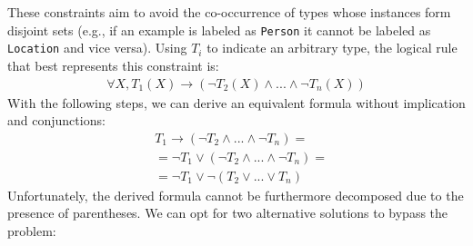 These constraints aim to avoid the co-occurrence of types whose instances form disjoint sets (e.g., if an example is labeled as \texttt{Person} it cannot be labeled as \texttt{Location} and vice versa). Using $T_i$ to indicate an arbitrary type, the logical rule that best represents this constraint is:
\begin{gather*}
    \forall X, T_{1}(X) \to (\neg T_{2}(X) \wedge ... \wedge \neg T_{n}(X))
\end{gather*}
With the following steps, we can derive an equivalent formula without implication and conjunctions:
\begin{align*}
    & T_{1} \to (\neg T_{2} \wedge ... \wedge \neg T_{n}) = \\
    & = \neg T_{1} \vee (\neg T_{2} \wedge ... \wedge \neg T_{n}) = \\
    & = \neg T_{1} \vee \neg (T_{2} \vee ... \vee T_{n})
\end{align*}
Unfortunately, the derived formula cannot be furthermore decomposed due to the presence of parentheses. We can opt for two alternative solutions to bypass the problem:
